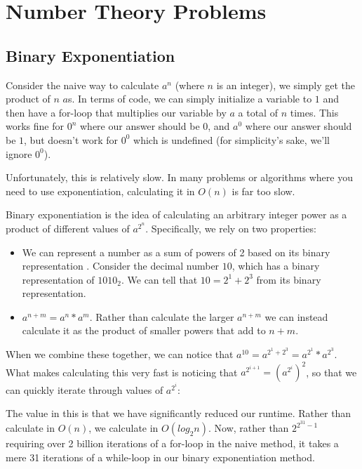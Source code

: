 \section{Number Theory Problems}

\subsection{Binary Exponentiation}

Consider the naive way to calculate $a^n$ (where $n$ is an integer), we simply get the product of $n$ $a$s. In terms of code, we can simply initialize a variable to $1$ and then have a for-loop that multiplies our variable by $a$ a total of $n$ times. This works fine for $0^n$ where our answer should be 0, and $a^0$ where our answer should be $1$, but doesn't work for $0^0$ which is undefined (for simplicity's sake, we'll ignore $0^0$).


Unfortunately, this is relatively slow. In many problems or algorithms where you need to use exponentiation, calculating it in $O(n)$ is far too slow.

Binary exponentiation is the idea of calculating an arbitrary integer power as a product of different values of $a^{2^n}$. Specifically, we rely on two properties:
\begin{itemize}
\item We can represent a number as a sum of powers of 2 based on its binary representation . Consider the decimal number $10$, which has a binary representation of $1010_2$. We can tell that $10 = 2^1 + 2^3$ from its binary representation.
\item $a^{n+m} = a^n * a^m$. Rather than calculate the larger $a^{n+m}$ we can instead calculate it as the product of smaller powers that add to $n+m$.
\end{itemize}

When we combine these together, we can notice that $a^{10} = a^{2^1 + 2^3} = a^{2^1} * a^{2^3}$. What makes calculating this very fast is noticing that $a^{2^{i+1}} = (a^{2^i})^2$, so that we can quickly iterate through values of $a^{2^i}$:


The value in this is that we have significantly reduced our runtime. Rather than calculate in $O(n)$, we calculate in $O(log_2n)$. Now, rather than $2^{2^{31}-1}$ requiring over 2 billion iterations of a for-loop in the naive method, it takes a mere 31 iterations of a while-loop in our binary exponentiation method.

